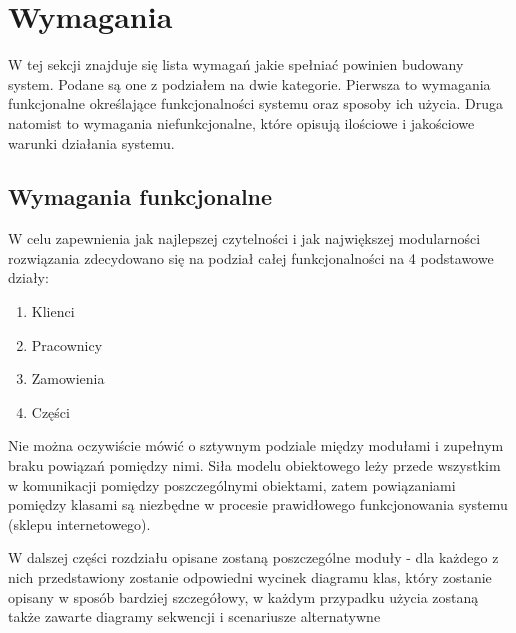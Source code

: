 ﻿\newpage
\section{Wymagania}


W tej sekcji znajduje się lista wymagań jakie spełniać powinien budowany system.
Podane są one z podziałem na dwie kategorie. Pierwsza to wymagania funkcjonalne
określające funkcjonalności systemu oraz sposoby ich użycia. Druga natomist to
wymagania niefunkcjonalne, które opisują ilościowe i jakościowe warunki
działania systemu.

\subsection{Wymagania funkcjonalne}





\pagebreak

W celu zapewnienia jak najlepszej czytelności i jak największej modularności
rozwiązania zdecydowano się na podział całej funkcjonalności na 4 podstawowe
działy:
\begin{enumerate}
	\item Klienci
	\item Pracownicy
	\item Zamowienia
	\item Części
\end{enumerate}

Nie można oczywiście mówić o sztywnym podziale między modułami i zupełnym braku
powiązań pomiędzy nimi. Siła modelu obiektowego leży przede wszystkim w
komunikacji pomiędzy poszczególnymi obiektami, zatem powiązaniami pomiędzy
klasami są niezbędne w procesie prawidłowego funkcjonowania systemu (sklepu
internetowego).

W dalszej części rozdziału opisane zostaną poszczególne moduły - dla każdego z
nich przedstawiony zostanie odpowiedni wycinek diagramu klas, który zostanie
opisany w sposób bardziej szczegółowy, w każdym przypadku użycia zostaną także
zawarte diagramy sekwencji i scenariusze alternatywne





